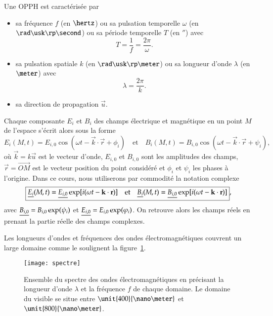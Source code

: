 Une OPPH est caractérisée par 
\begin{itemize}
	\item sa fréquence $f$ (en $\hertz$) ou sa pulsation temporelle $\omega$ 
		(en $\rad \usk \rp \second$) ou sa période temporelle $T$ (en $\second$)
	  avec
	  \begin{equation*}
		  T = \frac{1}{f} = \frac{2\pi}{\omega}.
	  \end{equation*}
  	\item sa pulsation spatiale $k$ (en $\rad \usk \rp \meter$) ou 
	  sa longueur d'onde $\lambda$ (en $\meter$) avec 
	  \begin{equation*}
		  \lambda = \dfrac{2 \pi}{k}.
	  \end{equation*}
	\item sa direction de propagation $\vec{u}$.
\end{itemize}

Chaque composante $E_i$ et $B_i$ des champs électrique et magnétique en un point 
$M$ de l'espace s'écrit alors
sous la forme
\begin{equation*}
	E_i(M, t) = E_{i, 0}\cos(\omega t - \vec{k} \cdot \vec{r} + \phi_i)
	\quad \mathrm{et} \quad
	B_i(M, t) = B_{i, 0}\cos(\omega t - \vec{k} \cdot \vec{r} + \psi_i),
\end{equation*}
où $\vec{k} = k \vec{u}$ est le vecteur d'onde, $E_{i, 0}$ et $B_{i, 0}$ 
sont les amplitudes des champs, 
$\vec{r} = \vec{OM}$ est le vecteur position du point considéré
et $\phi_i$ et $\psi_i$ les phases à l'origine. 
Dans ce cours, nous utiliserons par commodité la notation complexe
\begin{equation*}
	\boxed{
		\underline{E_i}(M, t) = \underline{E_{i, 0}}\exp[i(
		\omega t - \mathbf{k} \cdot \mathbf{r})]
	\quad \mathrm{et} \quad
\underline{B_i}(M, t) = \underline{B_{i, 0}}\exp[i(\omega t - \mathbf{k} \cdot \mathbf{r})]},
\end{equation*}
avec $\underline{B_{i, 0}} = B_{i, 0} \exp(\psi_i)$ et 
$\underline{E_{i, 0}} = E_{i, 0} \exp(\varphi_i)$. On retrouve alors les champs réels
en prenant la partie réelle des champs complexes.

\begin{rema}
Les longueurs d'ondes et fréquences des ondes électromagnétiques couvrent un large
domaine comme le soulignent la figure~\ref{fig:maxwell_spectre}.
\end{rema}

\begin{figure}[]
	\centering
	\texttt{[image: spectre]}
	\caption{Ensemble du spectre des ondes électromagnétiques en précisant
	la longueur d'onde $\lambda$ et la fréquence $f$ de chaque domaine. Le
	domaine du visible se situe entre $\unit{400}{\nano \meter}$ et
	$\unit{800}{\nano \meter}$.}%
	\label{fig:maxwell_spectre}
\end{figure}

